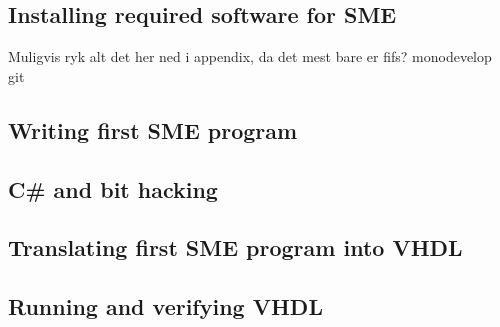 \subsection{Installing required software for SME} Muligvis ryk alt det her ned
i appendix, da det mest bare er fifs?
monodevelop git
\subsection{Writing first SME program}
\subsection{C\# and bit hacking}
\subsection{Translating first SME program into VHDL}
\subsection{Running and verifying VHDL}
